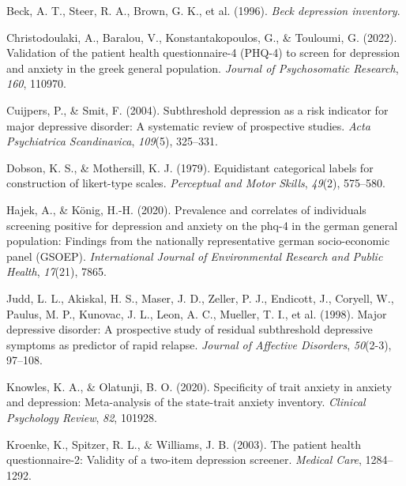 \documentclass[
  jou,
  longtable,
  nolmodern,
  notxfonts,
  notimes,
  mask,
  colorlinks=true,linkcolor=blue,citecolor=blue,urlcolor=blue]{apa7}
\newlength{\cslhangindent}
\newenvironment{CSLReferences}[2] %
 {\begin{list}{}{%
  \setlength{\itemindent}{0pt}
  \setlength{\leftmargin}{0pt}
  \setlength{\parsep}{0pt}
  \ifodd #1
   \setlength{\leftmargin}{\cslhangindent}
   \setlength{\itemindent}{-1\cslhangindent}
  \fi
  \setlength{\itemsep}{#2\baselineskip}}}
 {\end{list}}
\begin{document}
\label{refs}
\begin{CSLReferences}{1}{0}
Beck, A. T., Steer, R. A., Brown, G. K., et al. (1996). \emph{Beck
depression inventory}.

Christodoulaki, A., Baralou, V., Konstantakopoulos, G., \& Touloumi, G.
(2022). Validation of the patient health questionnaire-4 (PHQ-4) to
screen for depression and anxiety in the greek general population.
\emph{Journal of Psychosomatic Research}, \emph{160}, 110970.

Cuijpers, P., \& Smit, F. (2004). Subthreshold depression as a risk
indicator for major depressive disorder: A systematic review of
prospective studies. \emph{Acta Psychiatrica Scandinavica},
\emph{109}(5), 325--331.

Dobson, K. S., \& Mothersill, K. J. (1979). Equidistant categorical
labels for construction of likert-type scales. \emph{Perceptual and
Motor Skills}, \emph{49}(2), 575--580.

Hajek, A., \& König, H.-H. (2020). Prevalence and correlates of
individuals screening positive for depression and anxiety on the phq-4
in the german general population: Findings from the nationally
representative german socio-economic panel (GSOEP). \emph{International
Journal of Environmental Research and Public Health}, \emph{17}(21),
7865.

Judd, L. L., Akiskal, H. S., Maser, J. D., Zeller, P. J., Endicott, J.,
Coryell, W., Paulus, M. P., Kunovac, J. L., Leon, A. C., Mueller, T. I.,
et al. (1998). Major depressive disorder: A prospective study of
residual subthreshold depressive symptoms as predictor of rapid relapse.
\emph{Journal of Affective Disorders}, \emph{50}(2-3), 97--108.

Knowles, K. A., \& Olatunji, B. O. (2020). Specificity of trait anxiety
in anxiety and depression: Meta-analysis of the state-trait anxiety
inventory. \emph{Clinical Psychology Review}, \emph{82}, 101928.

Kroenke, K., Spitzer, R. L., \& Williams, J. B. (2003). The patient
health questionnaire-2: Validity of a two-item depression screener.
\emph{Medical Care}, 1284--1292.


\end{CSLReferences}
\end{document}
